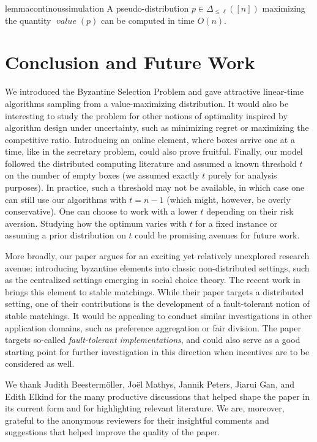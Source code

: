 \documentclass[sigconf,nonacm]{aamas}
\DeclareMathOperator{\valueText}{\textit{value}}
\newcommand{\val}[1]{\valueText({#1})}
\begin{document}
\begin{restatable}{lemma}{continoussimulation}\label{lemma:continous-simulation} A pseudo-distribution $p \in \Delta_{\leq \ell}([n])$ maximizing the quantity $\val{p}$ can be computed in time $O(n)$.
\end{restatable}

\section{Conclusion and Future Work}

We introduced the Byzantine Selection Problem and gave attractive linear-time algorithms sampling from a value-maximizing distribution. It would also be interesting to study the problem for other notions of optimality inspired by algorithm design under uncertainty, such as minimizing regret or maximizing the competitive ratio. Introducing an online element, where boxes arrive one at a time, like in the secretary problem, could also prove fruitful. Finally, our model followed the distributed computing literature and assumed a known threshold $t$ on the number of empty boxes (we assumed exactly $t$ purely for analysis purposes). In practice, such a threshold may not be available, in which case one can still use our algorithms with $t = n - 1$ (which might, however, be overly conservative). One can choose to work with a lower $t$ depending on their risk aversion. Studying how the optimum varies with $t$ for a fixed instance or assuming a prior distribution on $t$ could be promising avenues for future work.

More broadly, our paper argues for an exciting yet relatively unexplored research avenue: introducing byzantine elements into classic non-distributed settings, such as the centralized settings emerging in social choice theory. The recent work in \cite{constantinescu2025byzantinestablematching} brings this element to stable matchings. While their paper targets a distributed setting, one of their contributions is the development of a fault-tolerant notion of stable matchings. It would be appealing to conduct similar investigations in other application domains, such as preference aggregation or fair division. The paper \cite{eliaz} targets so-called \emph{fault-tolerant implementations}, and could also serve as a good starting point for further investigation in this direction when incentives are to be considered as well.

\begin{acks}
We thank Judith Beestermöller, Joël Mathys, Jannik Peters, Jiarui Gan, and Edith Elkind for the many productive discussions that helped shape the paper in its current form and for highlighting relevant literature. We are, moreover, grateful to the anonymous reviewers for their insightful comments and suggestions that helped improve the quality of the paper.
\end{acks}
\end{document}
